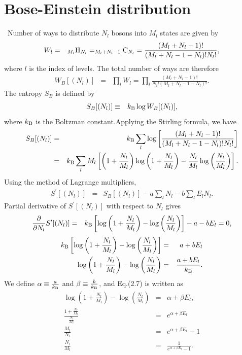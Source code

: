 \documentclass[12pt,a4paper]{report}
\newcommand{\kb} {k_{\rm B}}				            %
\begin{document}
\section{Bose-Einstein distribution}
\ Number of ways to distribute $N_l$ bosons into $M_l$ states are given by
\begin{eqnarray}
W_l & = & _{M_l} {\rm H}_{N_l} = _{M_l + N_l - 1} {\rm C}_{N_l} =  \frac{(M_l+N_l-1)!}{(M_l+N_l-1-N_l)!N_l!}
,
\end{eqnarray}
where $l$ is the index of levels.
The total number of ways are therefore
\begin{eqnarray}
W_B[(N_l)] & = & \prod_l W_l = \prod_l \frac{(M_l+N_l-1)!}{N_l!(M_l+N_l-1-N_l)!}.
\end{eqnarray}
The entropy $S_B$ is defined by
\begin{eqnarray}
S_B[(N_l)] & \equiv & \kb \log W_B[(N_l)],
\end{eqnarray}
where $\kb$ is the Boltzman constant.Applying the Stirling formula, we have
\begin{eqnarray}
S_B[(N_l)] & = & \kb \sum_l \log
\left[
\frac{(M_l+N_l-1)!}{(M_l+N_l-1-N_l)!N_l!}
\right] \nonumber
\\
& = & \kb \sum_l M_l
\left[
\left(1 + \frac{N_l}{M_l}\right)
\log \left(1 + \frac{N_l}{M_l}\right)
- \frac{N_l}{M_l} \log \left( \frac{N_l}{M_l}\right)
\right].
\end{eqnarray}
Using the method of Lagrange multipliers,
\begin{eqnarray}
S^\prime [(N_l )] & = & S_B[( N_l )] - a \sum_l N_l - b \sum_l E_l N_l.
\end{eqnarray}
Partial derivative of $S^\prime [(N_l )]$ with respect to $N_l$ gives
\begin{eqnarray}
\frac{\partial}{\partial N_l}S^\prime [(N_l )] & = &
\kb
\left[
\log \left(1 + \frac{N_l}{M_l} \right) - \log \left( \frac{N_l}{M_l} \right)
\right] - a - b E_l = 0,
\end{eqnarray}
\begin{eqnarray}
\kb
\left[
\log \left(1 + \frac{N_l}{M_l} \right) - \log \left( \frac{N_l}{M_l} \right)
\right] & = & a + b E_l  \nonumber
\\
\log \left(1 + \frac{N_l}{M_l} \right) - \log \left( \frac{N_l}{M_l} \right)
& = & \frac{a + b E_l}{\kb}.
\end{eqnarray}
We define $\alpha \equiv \frac{a}{\kb}$ and $\beta \equiv \frac{b}{\kb}$, and Eq.(2.7) is written as
\begin{eqnarray}
\log \left(1 + \frac{N_l}{M_l} \right) - \log \left( \frac{N_l}{M_l} \right)
& = & \alpha + \beta E_l,
\\
\frac{1+\frac{N_l}{M_l}}{\frac{N_l}{M_l}} & = & e^{\alpha + \beta E_l} \nonumber
\\
\frac{M_l}{N_l} & = & e^{\alpha + \beta E_l} - 1 \nonumber
\\
\frac{N_l}{M_l} & = & \frac{1}{e^{\alpha + \beta E_l} -1}.
\end{eqnarray}
\end{document}
